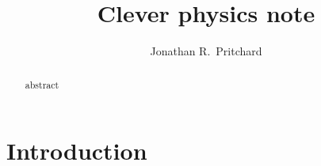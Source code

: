 \documentclass[prd,11pt,letterpaper]{revtex4}
\begin{document}
 
   \title{Clever physics note}
 
 \author{Jonathan R.~Pritchard}

 
 \begin{abstract}

abstract

\end{abstract}
 
 
 
\maketitle

\section{Introduction} 
\label{sec:intro}


 



 
 
\end{document}
